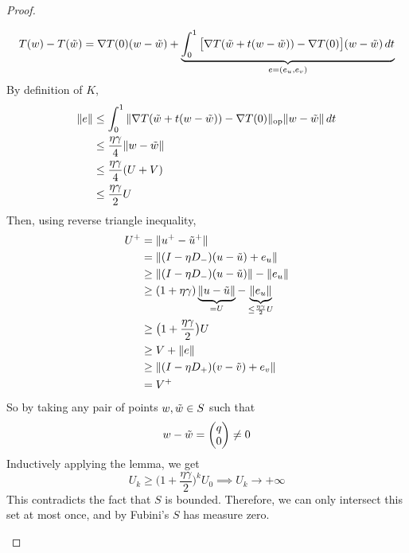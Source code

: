 \begin{proof}
\begin{enumerate}
\begin{equation}
					T(w) - T(\Tilde{w}) = \nabla T(0) (w - \Tilde{w}) + \underbrace{\int_0^1  \big[ \nabla T(\Tilde{w} + t(w - \Tilde{w})) - \nabla T(0) \big] (w - \Tilde{w}) \,dt}_{e = (e_u, e_v)}
				\end{equation}
				By definition of $K$, 
				\begin{align}
					\|e\| & \leq \int_0^1 \| \nabla T(\Tilde{w} + t(w - \Tilde{w})) - \nabla T(0) \|_{\mathrm{op}} \|w - \Tilde{w} \| \,dt \\ 
								& \leq \frac{\eta \gamma}{4} \|w - \Tilde{w}\| \\ 
								& \leq \frac{\eta \gamma}{4} (U + V) \\ 
								& \leq \frac{\eta \gamma}{2} U
				\end{align}
				Then, using reverse triangle inequality, 
				\begin{align}
					U^+ & = \|u^+ - \Tilde{u}^+ \| \\ 
							& = \|(I - \eta D_-) (u - \Tilde{u}) + e_u \| \\ 
							& \geq \| (I - \eta D_-) (u - \Tilde{u})\| - \|e_u\| \\ 
							& \geq (1 + \eta \gamma) \underbrace{\|u - \Tilde{u}\|}_{=U} - \underbrace{\|e_u\|}_{\leq \frac{\eta \gamma}{2} U} \\ 
							& \geq \big( 1 + \frac{\eta \gamma}{2} \big) U \\ 
							& \geq V + \|e\| \\ 
							& \geq \|(I - \eta D_+ ) (v - \Tilde{v}) + e_v\| \\ 
							& = V^+
				\end{align}
				So by taking any pair of points $w, \Tilde{w} \in S$ such that 
				\begin{equation}
					w - \Tilde{w} = \begin{pmatrix} q \\ 0 \end{pmatrix} \neq 0
				\end{equation}
				Inductively applying the lemma, we get 
				\begin{equation}
					U_k \geq \big( 1 + \frac{\eta \gamma}{2} \big)^k U_0 \implies U_k \to +\infty
				\end{equation}
				This contradicts the fact that $S$ is bounded. Therefore, we can only intersect this set at most once, and by Fubini's $S$ has measure zero. 
		\end{enumerate}


\end{proof}
